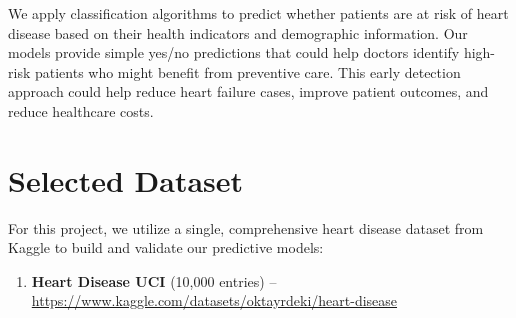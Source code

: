 \documentclass[11pt,a4paper]{article}
\begin{document}
We apply classification algorithms to predict whether patients are at risk of heart disease
based on their health indicators and demographic information.
Our models provide simple yes/no predictions that could help doctors
identify high-risk patients who might benefit from preventive care.
This early detection approach could help reduce heart failure cases,
improve patient outcomes, and reduce healthcare costs.


\section{Selected Dataset}

\begin{tcolorbox}[notebox={Dataset Information}]
    For this project, we utilize a single, comprehensive heart disease dataset from Kaggle to build and validate our predictive models:
    \vspace{-0.25cm}
    \begin{enumerate}[leftmargin=*, itemsep=2pt, parsep=0pt]
        \item \textbf{Heart Disease UCI} (10,000 entries) –
              \url{https://www.kaggle.com/datasets/oktayrdeki/heart-disease}
    \end{enumerate}
\end{tcolorbox}
\end{document}
